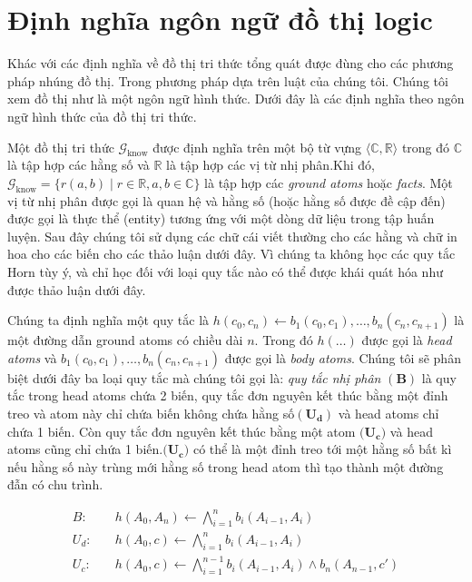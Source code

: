 \section{Định nghĩa ngôn ngữ đồ thị logic}\label{kg}

Khác với các định nghĩa về đồ thị tri thức tổng quát được đùng cho các phương pháp nhúng đồ thị. Trong phương pháp dựa trên luật của chúng tôi. Chúng tôi xem đồ thị như là một ngôn ngữ hình thức. Dưới đây là các định nghĩa theo ngôn ngữ hình thức của đồ thị tri thức.

Một đồ thị tri thức \(\mathcal{G}_{\text{know}}\) được định nghĩa trên một bộ từ vựng \(\langle \mathbb{C}, \mathbb{R} \rangle\) trong đó \(\mathbb{C}\) là tập hợp các hằng số và \(\mathbb{R}\) là tập hợp các vị từ nhị phân.Khi đó, \(\mathcal{G}_{\text{know}} = \{r (a, b) \mid r \in \mathbb{R}, a, b \in \mathbb{C}\}\) là tập hợp các \textit{ground atoms} hoặc \textit{facts}. Một vị từ nhị phân được gọi là quan hệ và hằng số (hoặc hằng số được đề cập đến) được gọi là thực thể (entity) tương ứng với một dòng dữ liệu trong tập huấn luyện. Sau đây chúng tôi sử dụng các chữ cái viết thường cho các hằng và chữ in hoa cho các biến cho các thảo luận dưới đây. Vì chúng ta không học các quy tắc Horn tùy ý, và chỉ học đối với loại quy tắc nào có thể được khái quát hóa như được thảo luận dưới đây.

Chúng ta định nghĩa một quy tắc là \(h(c_0, c_n) \gets b_1(c_0, c_1) ,\dots ,b_n(c_{n}, c_{n + 1})\) là một đường dẫn ground atoms có chiều dài \(n\). Trong đó \(h(\dots)\) được gọi là \textit{head atoms} và \( b_1(c_0, c_1) ,\dots ,b_n(c_{n}, c_{n + 1})\) được gọi là \textit{body atoms}. Chúng tôi sẽ phân biệt dưới đây ba loại quy tắc mà chúng tôi gọi là: \textit{quy tắc nhị phân} \((\mathbf{B})\) là quy tắc trong head atoms chứa 2 biến, quy tắc đơn nguyên kết thúc bằng một đỉnh treo  và atom này chỉ chứa biến không chứa hằng số\((\mathbf{U_d})\) và head atoms chỉ chứa 1 biến. Còn quy tắc đơn nguyên kết thúc bằng một atom \((\mathbf{U_c)}\) và head atoms cũng chỉ chứa 1 biến.\((\mathbf{U_c)}\)  có thể là một đỉnh treo tới một hằng số bất kì nếu hằng số này trùng mới hằng số trong head atom thì tạo thành một đường đẫn có chu trình.

\begin{equation}
	\begin{aligned}
		B: \quad & h(A_0, A_n) \gets \bigwedge_{i=1}^{n} b_i(A_{i-1}, A_i) \\
		U_d: \quad & h(A_0, c) \gets \bigwedge_{i=1}^{n} b_i(A_{i-1}, A_i) \\
		U_c: \quad & h(A_0, c) \gets \bigwedge_{i=1}^{n-1} b_i(A_{i-1}, A_i) \wedge b_n(A_{n-1}, c')
	\end{aligned}
\end{equation}


